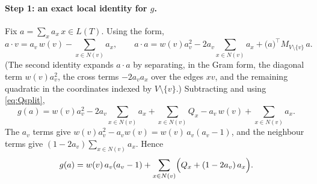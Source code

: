 \documentclass[11pt]{article}
\theoremstyle{definition}
\begin{document}
\paragraph{Step 1: an exact local identity for $g$.}
Fix $a=\sum_x a_x\,x\in L(T)$. Using the form,
\[
a\cdot v=a_v\,w(v)-\sum_{x\in N(v)}a_x,
\qquad
a\cdot a=w(v)a_v^2-2a_v\!\!\sum_{x\in N(v)}\!\!a_x+\bigl(a\bigr)^\top M_{V\setminus\{v\}}\,a .
\]
(The second identity expands $a\cdot a$ by separating, in the Gram form, the diagonal
term $w(v)a_v^2$, the cross terms $-2a_v a_x$ over the edges $xv$, and the remaining
quadratic in the coordinates indexed by $V\setminus\{v\}$.) Subtracting and using
\eqref{eq:Qsplit},
\[
g(a)=w(v)a_v^2-2a_v\!\!\sum_{x\in N(v)}\!\!a_x+\sum_{x\in N(v)}Q_x-a_v\,w(v)+\sum_{x\in N(v)}a_x .
\]
The $a_v$ terms give $w(v)a_v^2-a_v w(v)=w(v)\,a_v(a_v-1)$, and the neighbour terms give
$(1-2a_v)\sum_{x\in N(v)}a_x$. Hence
\begin{equation}\label{eq:key-identity}
g(a)=w(v)\,a_v(a_v-1)+\sum_{x\in N(v)}\Bigl(Q_x+(1-2a_v)\,a_x\Bigr).
\end{equation}
\end{document}
